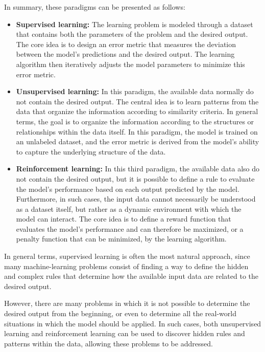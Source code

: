 In summary, these paradigms can be presented as follows:
\begin{itemize}
    \item \textbf{Supervised learning:} The learning problem is modeled through a dataset that contains both the parameters of the problem and the desired output. The core idea is to design an error metric that measures the deviation between the model's predictions and the desired output. The learning algorithm then iteratively adjusts the model parameters to minimize this error metric.
    \item \textbf{Unsupervised learning:} In this paradigm, the available data normally do not contain the desired output. The central idea is to learn patterns from the data that organize the information according to similarity criteria. In general terms, the goal is to organize the information according to the structures or relationships within the data itself. In this paradigm, the model is trained on an unlabeled dataset, and the error metric is derived from the model's ability to capture the underlying structure of the data.
    \item \textbf{Reinforcement learning:} In this third paradigm, the available data also do not contain the desired output, but it is possible to define a rule to evaluate the model's performance based on each output predicted by the model. Furthermore, in such cases, the input data cannot necessarily be understood as a dataset itself, but rather as a dynamic environment with which the model can interact. The core idea is to define a reward function that evaluates the model's performance and can therefore be maximized, or a penalty function that can be minimized, by the learning algorithm.
\end{itemize}

In general terms, supervised learning is often the most natural approach, since many machine-learning problems consist of finding a way to define the hidden and complex rules that determine how the available input data are related to the desired output.

However, there are many problems in which it is not possible to determine the desired output from the beginning, or even to determine all the real-world situations in which the model should be applied. In such cases, both unsupervised learning and reinforcement learning can be used to discover hidden rules and patterns within the data, allowing these problems to be addressed.

